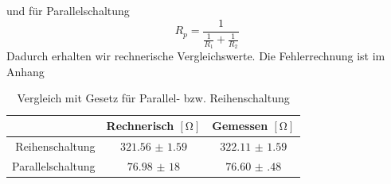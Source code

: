 und für Parallelschaltung
\begin{equation*}
	R_p = \frac{1}{\frac{1}{R_1} + \frac{1}{R_2}}
\end{equation*}
Dadurch erhalten wir rechnerische Vergleichswerte. Die Fehlerrechnung ist im Anhang
\begin{table}[H]
	\centering
	\begin{tabular}{r|cc}
			& Rechnerisch $ [\si{\ohm}] $ & Gemessen $ [\si{\ohm}] $ \\\hline
			Reihenschaltung & $ \num{321.56(159)} $ & $ \num{322.11(159)} $\\
			Parallelschaltung & $ \num{76,98(18)} $ & $ \num{76.60(48)} $
	\end{tabular}
	\caption{Vergleich mit Gesetz für Parallel- bzw. Reihenschaltung}
\end{table}

